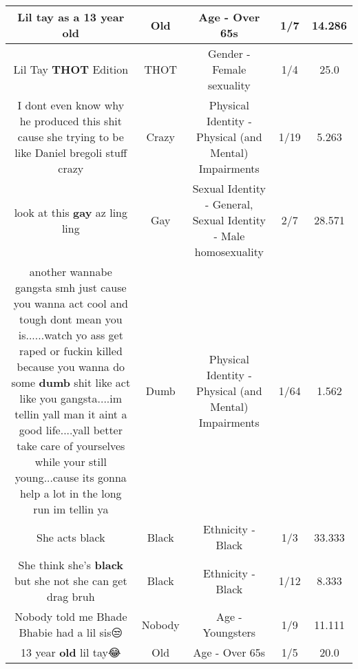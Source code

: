 \documentclass[11pt]{article}
\newlength\mylength
\begin{document}
\begin{center}
\begin{longtable}{|C{.65\mylength}|C{.30\mylength}|C{.12\mylength}|C{.12\mylength}|C{.12\mylength}|}
  \small Lil tay as a 13 year old\normalsize   & Old & Age - Over 65s & 1/7 & 14.286 \\  \hline
  \small Lil Tay \textbf{THOT} Edition\normalsize   & THOT & Gender - Female sexuality & 1/4 & 25.0 \\  \hline
  \small I dont even know why he produced this shit cause she trying to be like Daniel bregoli stuff crazy\normalsize   & Crazy & Physical Identity - Physical (and Mental) Impairments & 1/19 & 5.263 \\  \hline
  \small look at this \textbf{g\textbf{ay}} az ling ling\normalsize   & Gay & Sexual Identity - General, Sexual Identity - Male homosexuality & 2/7 & 28.571 \\  \hline
  \small another wannabe gangsta smh just cause you wanna act cool and tough dont mean you is......watch yo ass get raped or fuckin killed because you wanna do some \textbf{dumb} shit like act like you gangsta....im tellin yall man it aint a good life....yall better take care of yourselves while your still young...cause its gonna help a lot in the long run im tellin ya\normalsize   & Dumb & Physical Identity - Physical (and Mental) Impairments & 1/64 & 1.562 \\  \hline
  \small She acts black\normalsize   & Black & Ethnicity - Black & 1/3 & 33.333 \\  \hline
  \small She think she's \textbf{black} but she not she can get drag bruh\normalsize   & Black & Ethnicity - Black & 1/12 & 8.333 \\  \hline
  \small Nobody told me Bhade Bhabie had a lil sis😒\normalsize   & Nobody & Age - Youngsters & 1/9 & 11.111 \\  \hline
  \small 13 year \textbf{old} lil tay😂\normalsize   & Old & Age - Over 65s & 1/5 & 20.0 \\  \hline

\end{longtable}
\end{center}
\end{document}
